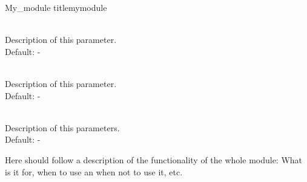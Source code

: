 \begin{moduledoc}{My\_module title}{mymodule}
  \item[\KeyWord{initialize} \optParam{ x } ]~\\
    Description of this parameter.\\
    Default: -
  \item[\KeyWord{exit} \optParam{ x } ]~\\
    Description of this parameter.\\
    Default: -
  \item[\KeyWord{myParam} \optParam{ x } ]~\\
    Description of this parameters.\\
    Default: -
\end{moduledoc}

Here should follow a description of the functionality of
the whole module: What is it for, when to use an when not to use
it, etc.


